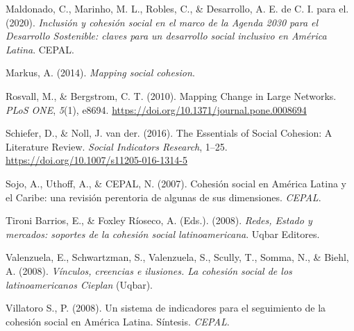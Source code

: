 \documentclass[
  12pt,
]{book}
\begin{document}
\leavevmode\hypertarget{ref-maldonado_inclusion_2020}{}%
Maldonado, C., Marinho, M. L., Robles, C., \& Desarrollo, A. E. de C. I. para el. (2020). \emph{Inclusión y cohesión social en el marco de la Agenda 2030 para el Desarrollo Sostenible: claves para un desarrollo social inclusivo en América Latina}. CEPAL.

\leavevmode\hypertarget{ref-markus_mapping_2014}{}%
Markus, A. (2014). \emph{Mapping social cohesion}.

\leavevmode\hypertarget{ref-rosvall_mapping_2010}{}%
Rosvall, M., \& Bergstrom, C. T. (2010). Mapping Change in Large Networks. \emph{PLoS ONE}, \emph{5}(1), e8694. \url{https://doi.org/10.1371/journal.pone.0008694}

\leavevmode\hypertarget{ref-schiefer_essentials_2016}{}%
Schiefer, D., \& Noll, J. van der. (2016). The Essentials of Social Cohesion: A Literature Review. \emph{Social Indicators Research}, 1--25. \url{https://doi.org/10.1007/s11205-016-1314-5}

\leavevmode\hypertarget{ref-sojo_cohesion_2007}{}%
Sojo, A., Uthoff, A., \& CEPAL, N. (2007). Cohesión social en América Latina y el Caribe: una revisión perentoria de algunas de sus dimensiones. \emph{CEPAL}.

\leavevmode\hypertarget{ref-tironibarrios_redes_2008}{}%
Tironi Barrios, E., \& Foxley Ríoseco, A. (Eds.). (2008). \emph{Redes, Estado y mercados: soportes de la cohesión social latinoamericana}. Uqbar Editores.

\leavevmode\hypertarget{ref-valenzuela_vinculos_2008}{}%
Valenzuela, E., Schwartzman, S., Valenzuela, S., Scully, T., Somma, N., \& Biehl, A. (2008). \emph{Vínculos, creencias e ilusiones. La cohesión social de los latinoamericanos Cieplan} (Uqbar).

\leavevmode\hypertarget{ref-villatoros._sistema_2008}{}%
Villatoro S., P. (2008). Un sistema de indicadores para el seguimiento de la cohesión social en América Latina. Síntesis. \emph{CEPAL}.
\end{document}
